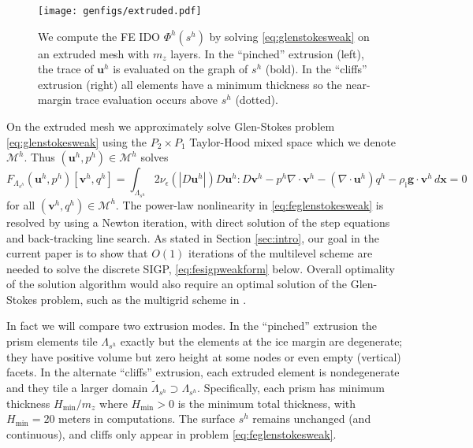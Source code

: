 \documentclass[letterpaper,final,12pt,reqno]{amsart}
\theoremstyle{claim}
\newcommand{\eps}{\epsilon}
\newcommand{\Div}{\nabla\cdot}
\newcommand{\bg}{\mathbf{g}}
\newcommand{\bu}{\mathbf{u}}
\newcommand{\bv}{\mathbf{v}}
\newcommand{\bx}{\mathbf{x}}
\newcommand{\rhoi}{\rho_{\text{i}}}
\numberwithin{equation}{section}
\numberwithin{figure}{section}
\numberwithin{table}{section}
\numberwithin{theorem}{section}
\begin{document}
\begin{figure}[t]
\begin{center}
\texttt{[image: genfigs/extruded.pdf]}
\end{center}
\caption{We compute the FE IDO $\Phi^h(s^h)$ by solving \eqref{eq:glenstokesweak} on an extruded mesh with $m_z$ layers.  In the ``pinched'' extrusion (left), the trace of $\bu^h$ is evaluated on the graph of $s^h$ (bold).  In the ``cliffs'' extrusion (right) all elements have a minimum thickness so the near-margin trace evaluation occurs above $s^h$ (dotted).}
\label{fig:extruded}
\end{figure}

On the extruded mesh we approximately solve Glen-Stokes problem \eqref{eq:glenstokesweak} using the $P_2\times P_1$ Taylor-Hood mixed space \cite{Elmanetal2014} which we denote $\mathcal{M}^h$.  Thus $(\bu^h,p^h) \in \mathcal{M}^h$ solves
\begin{equation}
F_{\Lambda_{s^h}}(\bu^h,p^h)[\bv^h,q^h] = \int_{\Lambda_{s^h}} 2 \nu_\eps(|D\bu^h|) D\bu^h : D\bv^h - p^h \Div\bv^h - (\Div\bu^h) q^h - \rhoi \bg \cdot \bv^h\,d\bx = 0 \label{eq:feglenstokesweak}
\end{equation}
for all $(\bv^h,q^h) \in \mathcal{M}^h$.  The power-law nonlinearity in \eqref{eq:feglenstokesweak} is resolved by using a Newton iteration, with direct solution of the step equations and back-tracking line search.  As stated in Section \ref{sec:intro}, our goal in the current paper is to show that $O(1)$ iterations of the multilevel scheme are needed to solve the discrete SIGP, \eqref{eq:fesigpweakform} below.  Overall optimality of the solution algorithm would also require an optimal solution of the Glen-Stokes problem, such as the multigrid scheme in \cite{IsaacStadlerGhattas2015}.

In fact we will compare two extrusion modes.  In the ``pinched'' extrusion the prism elements tile $\Lambda_{s^h}$ exactly but the elements at the ice margin are degenerate; they have positive volume but zero height at some nodes or even empty (vertical) facets.  In the alternate ``cliffs'' extrusion, each extruded element is nondegenerate and they tile a larger domain $\tilde\Lambda_{s^h} \supset \Lambda_{s^h}$.  Specifically, each prism has minimum thickness $H_{\text{min}}/m_z$ where $H_{\text{min}} > 0$ is the minimum total thickness, with $H_{\text{min}} = 20$ meters in computations.  The surface $s^h$ remains unchanged (and continuous), and cliffs only appear in problem \eqref{eq:feglenstokesweak}.
\end{document}
